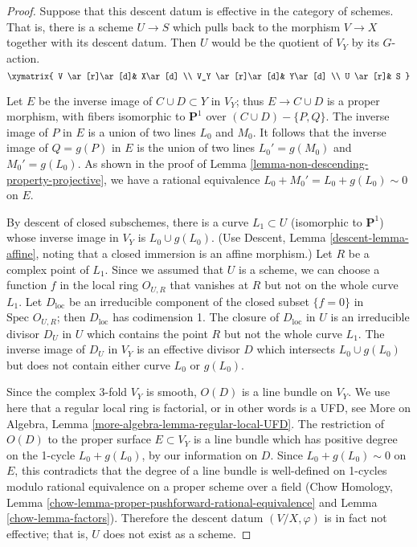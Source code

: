\begin{proof}
\medskip\noindent
Suppose that this descent datum is effective in the category
of schemes. That is, there is a scheme $U\to S$
which pulls back to the morphism $V\to X$ together
with its descent datum. Then $U$ would be the quotient
of $V_Y$ by its $G$-action.
$$
\xymatrix{
V \ar[r]\ar[d]&  X\ar[d] \\
V_Y \ar[r]\ar[d]& Y\ar[d] \\
U \ar[r]& S
}
$$

\medskip\noindent
Let $E$ be the inverse image of $C\cup D\subset Y$ in $V_Y$;
thus $E\rightarrow C\cup D$ is a proper morphism, with fibers
isomorphic to ${\mathbf P}^1$ over $(C\cup D)-\{P,Q\}$.
The inverse image of $P$ in $E$ is a union of two lines $L_0$
and $M_0$. It follows that the inverse image of $Q=g(P)$ in $E$
is the union of two lines $L_0'=g(M_0)$ and $M_0'=g(L_0)$.
As shown in the proof
of Lemma \ref{lemma-non-descending-property-projective},
we have a rational equivalence $L_0+M_0'=L_0+g(L_0)\sim 0$ on $E$.

\medskip\noindent
By descent of closed subschemes, there is a curve $L_1\subset U$
(isomorphic to ${\mathbf P}^1$)
whose inverse image in $V_Y$ is $L_0\cup g(L_0)$. (Use Descent, Lemma
\ref{descent-lemma-affine}, noting that a closed immersion is an affine
morphism.)
Let $R$ be a complex point of $L_1$. Since
we assumed that $U$ is a scheme, we can choose a function
$f$ in the local ring $O_{U,R}$ that vanishes at $R$ but not
on the whole curve $L_1$. Let $D_{\text{loc}}$ be an irreducible component
of the closed subset $\{ f=0\}$ in $\text{Spec }O_{U,R}$; then
$D_{\text{loc}}$ has codimension 1.
The closure of $D_{\text{loc}}$ in $U$ is an irreducible divisor $D_U$
in $U$ which contains the point $R$ but not the whole curve $L_1$.
The inverse image of $D_U$ in $V_Y$ is an effective divisor $D$
which intersects $L_0\cup g(L_0)$ but does not contain either
curve $L_0$ or $g(L_0)$.

\medskip\noindent
Since the complex 3-fold $V_Y$ is smooth, $O(D)$ is a line
bundle on $V_Y$. We use here that a regular local ring is factorial,
or in other words is a UFD, see
More on Algebra, Lemma \ref{more-algebra-lemma-regular-local-UFD}.
The restriction of $O(D)$ to the proper surface
$E\subset V_Y$ is a line bundle which has positive degree on the 1-cycle
$L_0+g(L_0)$, by our information on $D$. Since
$L_0+g(L_0)\sim 0$ on $E$, this contradicts 
that the degree of a line bundle is well-defined
on 1-cycles modulo rational equivalence on a proper scheme
over a field (Chow Homology,
Lemma \ref{chow-lemma-proper-pushforward-rational-equivalence}
and Lemma \ref{chow-lemma-factors}). Therefore the descent datum
$(V/X,\varphi)$ is in fact not effective; that is, $U$ does not exist
as a scheme.
\end{proof}

